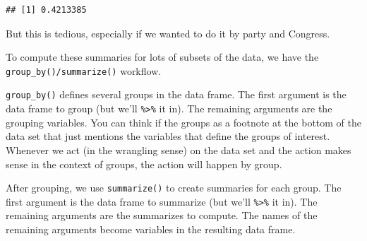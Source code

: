 \documentclass[]{book}
\newenvironment{Shaded}{\begin{snugshade}}{\end{snugshade}}
\newcommand{\CommentTok}[1]{\textcolor[rgb]{0.56,0.35,0.01}{\textit{#1}}}
\newcommand{\DataTypeTok}[1]{\textcolor[rgb]{0.13,0.29,0.53}{#1}}
\newcommand{\KeywordTok}[1]{\textcolor[rgb]{0.13,0.29,0.53}{\textbf{#1}}}
\newcommand{\NormalTok}[1]{#1}
\newcommand{\OperatorTok}[1]{\textcolor[rgb]{0.81,0.36,0.00}{\textbf{#1}}}
\newcommand{\OtherTok}[1]{\textcolor[rgb]{0.56,0.35,0.01}{#1}}
\newcommand{\StringTok}[1]{\textcolor[rgb]{0.31,0.60,0.02}{#1}}
\begin{document}
\begin{verbatim}
## [1] 0.4213385
\end{verbatim}

But this is tedious, especially if we wanted to do it by party and Congress.

To compute these summaries for lots of subsets of the data, we have the \texttt{group\_by()/summarize()} workflow.

\texttt{group\_by()} defines several groups in the data frame. The first argument is the data frame to group (but we'll \texttt{\%\textgreater{}\%} it in). The remaining arguments are the grouping variables. You can think if the groups as a footnote at the bottom of the data set that just mentions the variables that define the groups of interest. Whenever we act (in the wrangling sense) on the data set and the action makes sense in the context of groups, the action will happen by group.

After grouping, we use \texttt{summarize()} to create summaries for each group. The first argument is the data frame to summarize (but we'll \texttt{\%\textgreater{}\%} it in). The remaining arguments are the summarizes to compute. The names of the remaining arguments become variables in the resulting data frame.

\begin{Shaded}
\end{Shaded}
\end{document}
